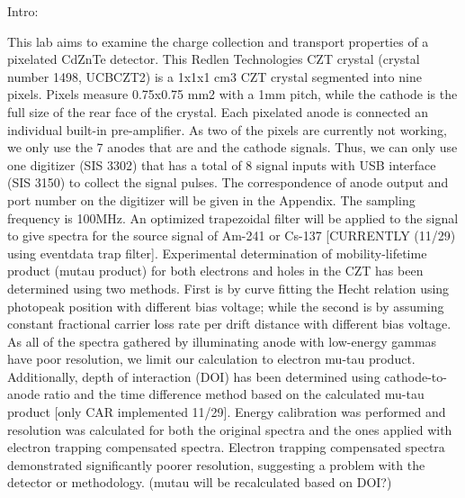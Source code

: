 


Intro:

This lab aims to examine the charge collection and transport properties of a pixelated CdZnTe detector. This Redlen Technologies CZT crystal (crystal number 1498, UCBCZT2) is a 1x1x1 cm3 CZT crystal segmented into nine pixels. Pixels measure 0.75x0.75 mm2 with a 1mm pitch, while the cathode is the full size of the rear face of the crystal. Each pixelated anode is connected an individual built-in pre-amplifier. As two of the pixels are currently not working, we only use the 7 anodes that are and the cathode signals. Thus, we can only use one digitizer (SIS 3302) that has a total of 8 signal inputs with USB interface (SIS 3150) to collect the signal pulses. The correspondence of anode output and port number on the digitizer will be given in the Appendix. The sampling frequency is 100MHz. An optimized trapezoidal filter will be applied to the signal to give spectra for the source signal of Am-241 or Cs-137 [CURRENTLY (11/29) using eventdata trap filter]. Experimental determination of mobility-lifetime product (mutau product) for both electrons and holes in the CZT has been determined using two methods. First is by curve fitting the Hecht relation using photopeak position with different bias voltage; while the second is by assuming constant fractional carrier loss rate per drift distance with different bias voltage. As all of the spectra gathered by illuminating anode with low-energy gammas have poor resolution, we limit our calculation to electron mu-tau product. Additionally, depth of interaction (DOI) has been determined using cathode-to-anode ratio and the time difference method based on the calculated mu-tau product [only CAR implemented 11/29]. Energy calibration was performed and resolution was calculated for both the original spectra and the ones applied with electron trapping compensated spectra. Electron trapping compensated spectra demonstrated significantly poorer resolution, suggesting a problem with the detector or methodology. (mutau will be recalculated based on DOI?)
